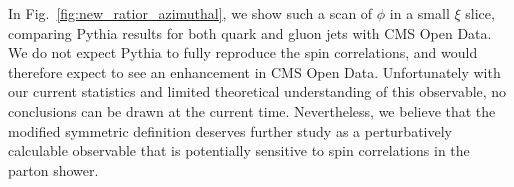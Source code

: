 \documentclass[letterpaper,11pt]{article}
\def\Fig#1{Fig.~{\ref{#1}}}
\DeclareRobustCommand{\Fig}[1]{Fig.~\ref{#1}}
\begin{document}
In \Fig{fig:new_ratior_azimuthal}, we show such a scan of $\phi$ in a small $\xi$ slice, comparing Pythia results for both quark and gluon jets with CMS Open Data.
%
We do not expect Pythia to fully reproduce the spin correlations, and would therefore expect to see an enhancement in CMS Open Data.
%
Unfortunately with our current statistics and limited theoretical understanding of this observable, no conclusions can be drawn at the current time.
%
Nevertheless, we believe that the modified symmetric definition deserves further study as a perturbatively calculable observable that is potentially sensitive to spin correlations in the parton shower. 









%
%





\end{document}
